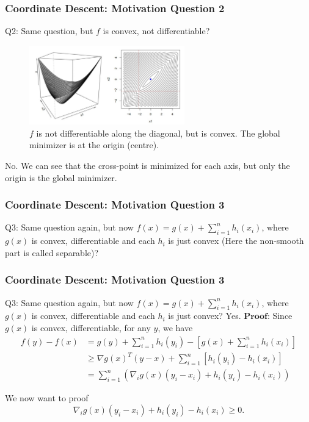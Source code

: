\begin{frame}
    \frametitle{Coordinate Descent: Motivation Question 2}
Q2: Same question, but $f$ is convex, not differentiable?
\pause
\begin{figure}[!htbp]
    \begin{center}
        \includegraphics[width=0.6\textwidth]{img/cd_q2.png}
    \end{center}
    \caption{$f$ is not differentiable along the diagonal, but is convex. The global minimizer is at the origin (centre).}\label{fig:cd_q2}
\end{figure}

No. We can see that the cross-point is minimized for each axis, but only the origin is the global minimizer.
\end{frame}

\begin{frame}
\frametitle{Coordinate Descent: Motivation Question 3}
Q3: Same question again, but now $f(x)=g(x)+\sum_{i=1}^n h_i\left(x_i\right)$, where $g(x)$ is convex, differentiable and each $h_i$ is just convex (Here the non-smooth part is called separable)?
\end{frame}

\begin{frame}
\frametitle{Coordinate Descent: Motivation Question 3}
Q3: Same question again, but now $f(x)=g(x)+\sum_{i=1}^n h_i\left(x_i\right)$, where $g(x)$ is convex, differentiable and each $h_i$ is just convex?
\newline\newline
Yes. $\textbf{Proof}$: Since $g(x)$ is convex, differentiable, for any $y$, we have
\begin{align*}
    f(y)-f(x)&=g(y)+\sum_{i=1}^n h_i\left(y_i\right)-\left[g(x)+\sum_{i=1}^n h_i\left(x_i\right)\right] \\
    &\geq \nabla g(x)^T(y-x)+\sum_{i=1}^n\left[h_i\left(y_i\right)-h_i\left(x_i\right)\right]\\
    &=\sum_{i=1}^n\left(\nabla_i g(x)\left(y_i-x_i\right)+h_i\left(y_i\right)-h_i\left(x_i\right)\right)
\end{align*}

We now want to proof
$$\nabla_i g(x)\left(y_i-x_i\right)+h_i\left(y_i\right)-h_i\left(x_i\right) \geq 0.$$
\end{frame}

